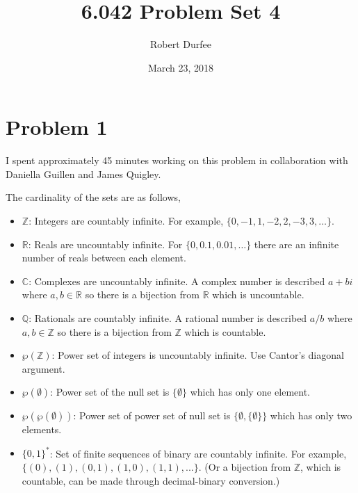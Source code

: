 \documentclass{article}
\title{ 6.042 Problem Set 4 }
\author{ Robert Durfee }
\date{ March 23, 2018 }
\begin{document}
\maketitle

\section*{Problem 1 }

I spent approximately 45 minutes working on this problem in collaboration with
Daniella Guillen and James Quigley.

\bigbreak

The cardinality of the sets are as follows,

\begin{itemize}
  \item $\mathbb{Z}$: Integers are countably infinite. For example, $\{0, -1, 1, -2, 2,
  -3, 3, \ldots\}$.

  \item $\mathbb{R}$: Reals are uncountably infinite. For $\{0,0.1,0.01,\ldots\}$ there
  are an infinite number of reals between each element.

  \item $\mathbb{C}$: Complexes are uncountably infinite. A complex number is described
  $a + bi$ where $a,b \in \mathbb{R}$ so there is a bijection from $\mathbb{R}$
  which is uncountable.

  \item $\mathbb{Q}$: Rationals are countably infinite. A rational number is described
  $a/b$ where $a,b \in \mathbb{Z}$ so there is a bijection from $\mathbb{Z}$ which
  is countable.

  \item $\wp(\mathbb{Z})$: Power set of integers is uncountably infinite. Use
  Cantor's diagonal argument.

  \item $\wp(\emptyset)$: Power set of the null set is $\{\emptyset\}$ which has
  only one element.

  \item $\wp(\wp(\emptyset))$: Power set of power set of null set is
  $\{\emptyset, \{\emptyset\}\}$ which has only two elements.

  \item $\{0,1\}^*$: Set of finite sequences of binary are countably infinite. For
  example, $\{(0), (1), (0,1), (1,0), (1,1), ...\}$. (Or a bijection from
  $\mathbb{Z}$, which is countable, can be made through decimal-binary conversion.)


\end{itemize}
\end{document}
